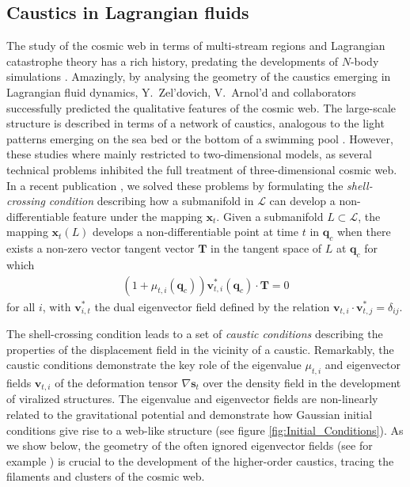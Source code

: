 \documentclass[a4paper, 11pt]{article}
\begin{document}
\subsection{Caustics in Lagrangian fluids}
The study of the cosmic web in terms of multi-stream regions and Lagrangian catastrophe theory has a rich history, predating the developments of $N$-body simulations \cite{Arnold:1982a, Arnold:1982b, Shandarin:1983, Rozhanskii:1984, Shandarin:1989}. Amazingly, by analysing the geometry of the caustics emerging in Lagrangian fluid dynamics, Y.\ Zel'dovich, V.\ Arnol'd and collaborators successfully predicted the qualitative features of the cosmic web. The large-scale structure is described in terms of a network of caustics, analogous to the light patterns emerging on the sea bed or the bottom of a swimming pool \cite{Berry:1977, Berry:1980, Feldbrugge:2019}. However, these studies where mainly restricted to two-dimensional models, as several technical problems inhibited the full treatment of three-dimensional cosmic web. In a recent publication \cite{Feldbrugge:2018}, we solved these problems by formulating the \textit{shell-crossing condition} describing how a submanifold in $\mathcal{L}$ can develop a non-differentiable feature under the mapping $\bm{x}_t$. Given a submanifold $L \subset \mathcal{L}$, the mapping $\bm{x}_t(L)$ develops a non-differentiable point at time $t$ in $\bm{q}_c$ when there exists a non-zero vector tangent vector $\bm{T}$ in the tangent space of $L$ at $\bm{q}_c$ for which 
\begin{align}
(1+\mu_{t,i}(\bm{q}_c))\bm{v}_{t,i}^*(\bm{q}_c) \cdot \bm{T}=0
\label{eq:shellCrossingCondition}
\end{align}
for all $i$, with $\bm{v}_{i,t}^*$ the dual eigenvector field defined by the relation $\bm{v}_{t,i}\cdot \bm{v}_{t,j}^* = \delta_{ij}$.

The shell-crossing condition leads to a set of \textit{caustic conditions} describing the properties of the displacement field in the vicinity of a caustic. Remarkably, the caustic conditions demonstrate the key role of the eigenvalue $\mu_{t,i}$ and eigenvector fields $\bm{v}_{t,i}$ of the deformation tensor $\nabla \bm{s}_t$ over the density field in the development of viralized structures. The eigenvalue and eigenvector fields are non-linearly related to the gravitational potential and demonstrate how Gaussian initial conditions give rise to a web-like structure (see figure \ref{fig:Initial_Conditions}). As we show below, the geometry of the often 
ignored eigenvector fields (see for example \cite{Forero:2009}) is crucial to the development of the higher-order caustics, tracing the filaments and clusters of the cosmic web.
\end{document}
